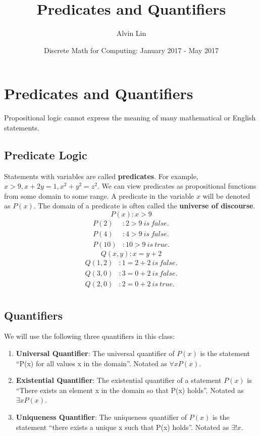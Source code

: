 \documentclass[letterpaper, 12pt]{math}
\title{Predicates and Quantifiers}
\author{Alvin Lin}
\date{Discrete Math for Computing: January 2017 - May 2017}
\begin{document}
\maketitle

\section*{Predicates and Quantifiers}
Propositional logic cannot express the meaning of many mathematical or
English statements.

\subsection*{Predicate Logic}
Statements with variables are called \textbf{predicates}. For example,
\( x > 9, x+2y = 1, x^{2}+y^{2} = z^{2} \).
We can view predicates as propositional functions from some domain to some
range. A predicate in the variable \( x \) will be denoted as \( P(x) \). The
domain of a predicate is often called the \textbf{universe of discourse}.
\[ P(x): x > 9 \]
\begin{align*}
  P(2)&: 2 > 9\ is\ false. \\
  P(4)&: 4 > 9\ is\ false. \\
  P(10)&: 10 > 9\ is\ true.
\end{align*}
\[ Q(x,y): x = y+2 \]
\begin{align*}
  Q(1,2)&: 1 = 2+2\ is\ false. \\
  Q(3,0)&: 3 = 0+2\ is\ false. \\
  Q(2,0)&: 2 = 0+2\ is\ true. \\
\end{align*}

\subsection*{Quantifiers}
We will use the following three quantifiers in this class:
\begin{enumerate}
  \item \textbf{Universal Quantifier}: The universal quantifier of \( P(x) \)
    is the statement ``P(x) for all values x in the domain''. Notated as
    \( \forall{x}P(x) \).
  \item \textbf{Existential Quantifier}: The existential quantifier of a
    statement \( P(x) \) is ``There exists an element x in the domain so
    that P(x) holds''. Notated as
    \( \exists{x}P(x) \).
  \item \textbf{Uniqueness Quantifier}: The uniqueness quantifier of \( P(x) \)
    is the statement ``there exists a unique x such that P(x) holds''. Notated
    as \( \exists{!x} \).
\end{enumerate}
\end{document}
